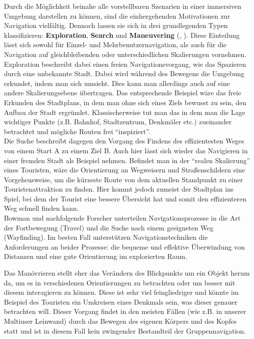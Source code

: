 Durch die Möglichkeit beinahe alle vorstellbaren Szenarien in einer immersiven Umgebung darstellen zu können, sind die einhergehenden Motivationen zur Navigation vielfältig. Dennoch lassen sie sich in drei grundlegenden Typen klassifizieren: \textbf{Exploration}, \textbf{Search} und \textbf{Maneuvering} (\cite{Bowman2001AnDesign}, \cite{KulikBuildingTechniques}). 
Diese Einteilung lässt sich sowohl für Einzel- und Mehrbenutzernavigation, als auch für die Navigation auf gleichbleibenden oder unterschiedlichen Skalierungen vornehmen.
Exploration beschreibt dabei einen freien Navigationsvorgang, wie das Spazieren durch eine unbekannte Stadt. Dabei wird während des Bewegens die Umgebung erkundet, indem man sich umsieht.
Dies kann man allerdings auch auf eine andere Skalierungsebene übertragen. Das entsprechende Beispiel wäre das freie Erkunden des Stadtplans, in dem man ohne sich eines Ziels bewusst zu sein, den Aufbau der Stadt ergründet. Klassischerweise tut man das in dem man die Lage wichtiger Punkte (z.B. Bahnhof, Stadtzentrum, Denkmäler etc.) zueinander betrachtet und mögliche Routen frei “inspiziert”.\\
Die Suche beschreibt dagegen den Vorgang des Findens des effizientesten Weges von einem Start A zu einem Ziel B. Auch hier lässt sich wieder das Navigieren in einer fremden Stadt als Beispiel nehmen. Befindet man in der “realen Skalierung” eines Touristen, wäre die Orientierung an Wegweisern und Straßenschildern eine Vorgehensweise, um die kürzeste Route von dem aktuellen Standpunkt zu einer Touristenattraktion zu finden. Hier kommt jedoch zumeist der Stadtplan ins Spiel, bei dem der Tourist eine bessere Übersicht hat und somit den effizienteren Weg schnell finden kann.\\
Bowman und nachfolgende Forscher unterteilen Navigationsprozesse in die Art der Fortbewegung (Travel) und die Suche nach einem geeigneten Weg (Wayfinding).
Im besten Fall unterstützen Navigationstechniken die Anforderungen an beider Prozesse: die bequeme und effektive Überwindung von Distanzen und eine gute Orientierung im explorierten Raum.

Das Manövrieren stellt eher das Verändern des Blickpunkts um ein Objekt herum da, um es in verschiedenen Orientierungen zu betrachten oder um besser mit diesem interagieren zu können. Diese ist sehr viel feingliedriger und könnte im Beispiel des Touristen ein Umkreisen eines Denkmals sein, was dieser genauer betrachten will. Dieser Vorgang findet in den meisten Fällen (wie z.B. in unserer Multiuser Leinwand) durch das Bewegen des eigenen Körpers und des Kopfes statt und ist in diesem Fall kein zwingender Bestandteil der Gruppennavigation.

